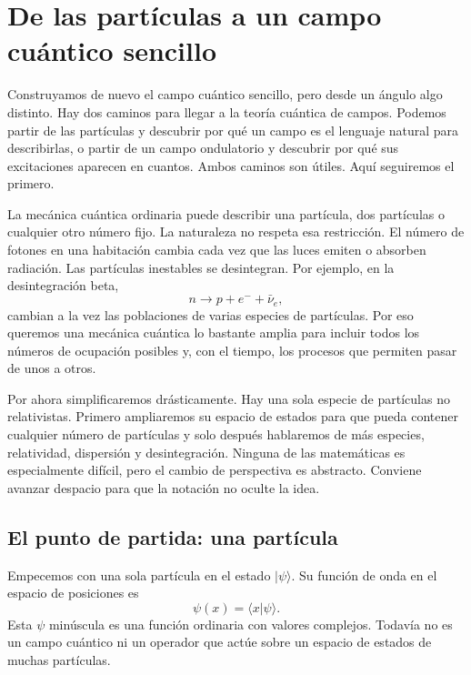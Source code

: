 \chapter{De las partículas a un campo cuántico sencillo}

Construyamos de nuevo el campo cuántico sencillo, pero desde un ángulo algo distinto. Hay dos caminos para llegar a la teoría cuántica de campos. Podemos partir de las partículas y descubrir por qué un campo es el lenguaje natural para describirlas, o partir de un campo ondulatorio y descubrir por qué sus excitaciones aparecen en cuantos. Ambos caminos son útiles. Aquí seguiremos el primero.

La mecánica cuántica ordinaria puede describir una partícula, dos partículas o cualquier otro número fijo. La naturaleza no respeta esa restricción. El número de fotones en una habitación cambia cada vez que las luces emiten o absorben radiación. Las partículas inestables se desintegran. Por ejemplo, en la desintegración beta,
\begin{equation}
n\longrightarrow p+e^-+\bar{\nu}_e,
\end{equation}
cambian a la vez las poblaciones de varias especies de partículas. Por eso queremos una mecánica cuántica lo bastante amplia para incluir todos los números de ocupación posibles y, con el tiempo, los procesos que permiten pasar de unos a otros.

Por ahora simplificaremos drásticamente. Hay una sola especie de partículas no relativistas. Primero ampliaremos su espacio de estados para que pueda contener cualquier número de partículas y solo después hablaremos de más especies, relatividad, dispersión y desintegración. Ninguna de las matemáticas es especialmente difícil, pero el cambio de perspectiva es abstracto. Conviene avanzar despacio para que la notación no oculte la idea.

\section{El punto de partida: una partícula}

Empecemos con una sola partícula en el estado \(|\psi\rangle\). Su función de onda en el espacio de posiciones es
\begin{equation}
\psi(x)=\langle x|\psi\rangle.
\label{eq:l07-wavefunction}
\end{equation}
Esta \(\psi\) minúscula es una función ordinaria con valores complejos. Todavía no es un campo cuántico ni un operador que actúe sobre un espacio de estados de muchas partículas.

